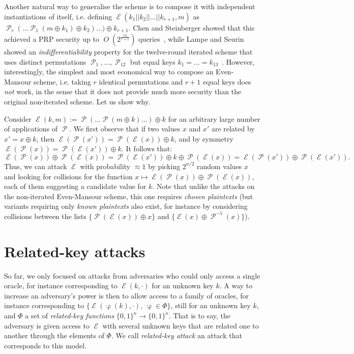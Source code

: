 \documentclass[11pt,a4paper]{article}
\theoremstyle{definition}
\DeclareMathOperator\E{\mathcal{E}}
\DeclareMathOperator\Perm{\mathcal{P}}
\DeclareMathOperator\bigo{\mathit{O}}
\DeclareMathOperator\rkf{\varphi}
\newcommand\ksb{\{0,1\}^\kappa}
\begin{document}
Another natural way to generalise the scheme is to compose it with independent instantiations of itself, i.e. defining $\E(k_1||k_2||\ldots||k_{r+1},m)$
as $\Perm_{r}(\ldots\Perm_{1}(m \oplus k_1) \oplus k_2)\ldots) \oplus k_{r+1}$. Chen and Steinberger showed that this achieved a PRP security up to
$\bigo(2^\frac{rn}{r+1})$ queries~\cite{DBLP:conf/eurocrypt/ChenS14}, while Lampe and Seurin showed an \emph{indifferentiability} property for the twelve-round iterated
scheme that uses distinct permutations $\Perm_1, \ldots, \Perm_{12}$ but equal keys $k_1 = \ldots = k_{13}$~\cite{DBLP:conf/asiacrypt/LampeS13}.
However, interestingly, the simplest
and most economical way to compose an Even-Mansour scheme, i.e. taking $r$ identical permutations and $r+1$ equal keys does \emph{not} work, in the sense
that it does not provide much more security than the original non-iterated scheme. Let us show why.

Consider $\E(k,m) := \Perm(\ldots\Perm(m \oplus k)\ldots)\oplus k$ for an arbitrary large number of applications of $\Perm$. We first observe that
if two values $x$ and $x'$ are related by $x' = x \oplus k$, then $\E(\Perm(x')) = \Perm(\E(x)) \oplus k$, and by symmetry $\E(\Perm(x)) = \Perm(\E(x')) \oplus k$.
It follows that:
\[
\E(\Perm(x)) \oplus \Perm(\E(x)) = \Perm(\E(x')) \oplus k \oplus \Perm(\E(x)) = \E(\Perm(x')) \oplus \Perm(\E(x')).
\]
Thus, we can attack $\E$ with probability $\approx 1$ by picking $2^{n/2}$ random values $x$ and looking for collisions for the function $x \mapsto \E(\Perm(x)) \oplus
\Perm(\E(x))$, each of them suggesting a candidate value for $k$. Note that unlike the attacks on the non-iterated Even-Mansour scheme, this one requires
\emph{chosen plaintexts} (but variants requiring only \emph{known plaintexts} also exist, for instance by considering collisions between
the lists $\{\Perm(\E(x)) \oplus x\}$ and $\{\E(x) \oplus \Perm^{-1}(x)\}$).

\section{Related-key attacks}

So far, we only focused on attacks from adversaries who could only access a single oracle, for instance corresponding to $\E(k,\cdot)$ for an unknown key
$k$. A way to increase an adversary's power is then to allow access to a family of oracles, for instance corresponding to $\{\E(\rkf(k), \cdot),~\rkf \in \Phi \}$,
still for an unknown key $k$, and $\Phi$ a set of \emph{related-key functions} $\ksb \rightarrow \ksb$. That is to say, the adversary is given access to
$\E$ with several unknown keys that are related one to another through the elements of $\Phi$. We call \emph{related-key attack} an attack that corresponds
to this model.
\end{document}
